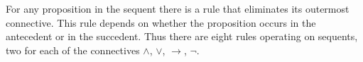

\setcounter{section}{2}
\setcounter{subsection}{4}
\setcounter{dfn}{6}


For any proposition in the sequent there is a rule that eliminates its outermost connective.
This rule depends on whether the proposition occurs in the antecedent or in the succedent.
Thus there are eight rules operating on sequents, two for each of the connectives $\wedge$, $\vee$, $\to$, $\neg$.


